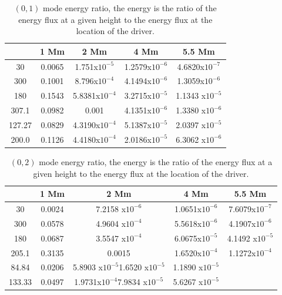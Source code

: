 \documentclass[preprint,authoryear,12pt]{elsarticle}
\begin{document}
\begin{table}[h]
\centering
\begin{tabular}{c c c c c }
\hline
   &  1 Mm & 2 Mm & 4 Mm & 5.5 Mm \\
\hline
30 &  0.0065 & 1.751x$10^{-5}$ &  1.2579x$10^{-6}$ & 4.6820x$10^{-7}$ \\
\hline
300 & 0.1001 & 8.796x$10^{-4}$ &  4.1494x$10^{-6}$ &  1.3059x$10^{-6}$ \\
\hline
180 & 0.1543 &  5.8381x$10^{-4}$ &  3.2715x$10^{-5}$ &  1.1343 x$10^{-5}$ \\
\hline
307.1 & 0.0982 & 0.001 & 4.1351x$10^{-6}$ & 1.3380 x$10^{-6}$  \\
\hline
127.27 & 0.0829 &  4.3190x$10^{-4}$ &  5.1387x$10^{-5}$ & 2.0397 x$10^{-5}$ \\ 
\hline
200.0 & 0.1126 &  4.4180x$10^{-4}$ &  2.0186x$10^{-5}$ & 6.3062 x$10^{-6}$ \\
\hline
\end{tabular} 
\caption{ $(0, 1)$ mode energy ratio, the energy is the ratio of the energy flux at a given height to the energy flux at the location of the driver.}
\label{Table01mode}
\end{table}

\begin{table}[h]
\centering
\begin{tabular}{c c c c c }
\hline
   &  1 Mm & 2 Mm & 4 Mm & 5.5 Mm \\
\hline
30 &  0.0024 & 7.2158 x$10^{-6}$ & 1.0651x$10^{-6}$ & 7.6079x$10^{-7}$\\
\hline
300 & 0.0578 & 4.9604 x$10^{-4}$ & 5.5618x$10^{-6}$ & 4.1907x$10^{-6}$\\
\hline
180 & 0.0687 & 3.5547 x$10^{-4}$ & 6.0675x$10^{-5}$ & 4.1492 x$10^{-5}$\\
\hline
205.1 & 0.3135 & 0.0015 &1.6520x$10^{-4}$ & 1.1272x$10^{-4}$\\
\hline
84.84 & 0.0206 &5.8903 x$10^{-5}$1.6520 x$10^{-5}$ & 1.1890 x$10^{-5}$\\
\hline
133.33 & 0.0497 & 1.9731x$10^{-4}$7.9834 x$10^{-5}$ & 5.6267 x$10^{-5}$\\
\hline
\end{tabular} 
\caption{ $(0, 2)$ mode energy ratio, the energy is the ratio of the energy flux at a given height to the energy flux at the location of the driver.}
\label{Table02mode}
\end{table}
\end{document}
